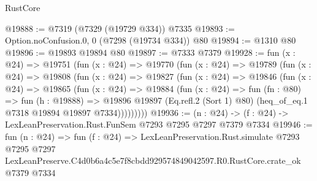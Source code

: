 \begin{lexlean}{RustCore}
\begin{coremodule}
@19888 := @7319 (@7329 (@19729 @334)) @7335
@19893 := Option.noConfusion.{0, 0} (@7298 (@19734 @334)) @80
@19894 := @1310 @80
@19896 := @19893 @19894 @80
@19897 := @7333 @7379
@19928 := fun (x : @24) =>
  @19751
    (fun (x : @24) =>
    @19770
      (fun (x : @24) =>
      @19789
        (fun (x : @24) =>
        @19808
          (fun (x : @24) =>
          @19827
            (fun (x : @24) =>
            @19846
              (fun (x : @24) =>
              @19865
                (fun (x : @24) =>
                @19884
                  (fun (x : @24) =>
                  fun (fn : @80) =>
                  fun (h : @19888) =>
                  @19896
                    @19897
                    (Eq.refl.{2} (Sort 1) @80)
                    (heq_of_eq.{1} @7318 @19894 @19897 @7334)))))))))
@19936 := (n : @24) -> (f : @24) -> LexLeanPreservation.Rust.FunSem @7293 @7295 @7297 @7379 @7334
@19946 := fun (n : @24) =>
  fun (f : @24) =>
  LexLeanPreservation.Rust.simulate
    @7293
    @7295
    @7297
    LexLeanPreserve.C4d0b6a4c5e7f8cbdd929574849042597.R0.RustCore.crate_ok
    @7379
    @7334
\end{coremodule}
\end{lexlean}

